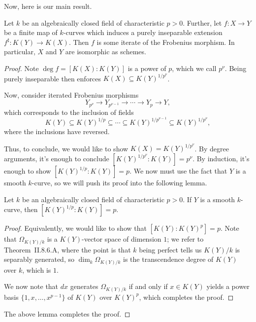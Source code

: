 \documentclass[../notes.tex]{subfiles}
\begin{document}
Now, here is our main result.
\begin{theorem}
	Let $k$ be an algebraically closed field of characteristic $p>0$. Further, let $f\colon X\to Y$ be a finite map of $k$-curves which induces a purely inseparable extension $f^\sharp\colon K(Y)\to K(X)$. Then $f$ is some iterate of the Frobenius morphism. In particular, $X$ and $Y$ are isomorphic as schemes.
\end{theorem}
\begin{proof}
	Note $\deg f=[K(X):K(Y)]$ is a power of $p$, which we call $p^\nu$. Being purely inseparable then enforces $K(X)\subseteq K(Y)^{1/p^\nu}$.

	Now, consider iterated Frobenius morphisms
	\[Y_{p^\nu}\to Y_{p^{\nu-1}}\to\cdots\to Y_p\to Y,\]
	which corresponds to the inclusion of fields
	\[K(Y)\subseteq K(Y)^{1/p}\subseteq\cdots\subseteq K(Y)^{1/p^{\nu-1}}\subseteq K(Y)^{1/p^\nu},\]
	where the inclusions have reversed.
	
	Thus, to conclude, we would like to show $K(X)=K(Y)^{1/p^\nu}$. By degree arguments, it's enough to conclude $\left[K(Y)^{1/p^\nu}:K(Y)\right]=p^\nu$. By induction, it's enough to show $\left[K(Y)^{1/p}:K(Y)\right]=p$. We now must use the fact that $Y$ is a smooth $k$-curve, so we will push its proof into the following lemma.
	\begin{lemma}
		Let $k$ be an algebraically closed field of characteristic $p>0$. If $Y$ is a smooth $k$-curve, then $\left[K(Y)^{1/p}:K(Y)\right]=p$.
	\end{lemma}
	\begin{proof}
		Equivalently, we would like to show that $\left[K(Y):K(Y)^p\right]=p$. Note that $\Omega_{K(Y)/k}$ is a $K(Y)$-vector space of dimension $1$; we refer to Theorem~II.8.6.A, where the point is that $k$ being perfect tells us $K(Y)/k$ is separably generated, so $\dim_k\Omega_{K(Y)/k}$ is the transcendence degree of $K(Y)$ over $k$, which is $1$.

		We now note that $dx$ generates $\Omega_{K(Y)/k}$ if and only if $x\in K(Y)$ yields a power basis $\{1,x,\ldots,x^{p-1}\}$ of $K(Y)$ over $K(Y)^p$, which completes the proof.
	\end{proof}
	The above lemma completes the proof.
\end{proof}
\end{document}
